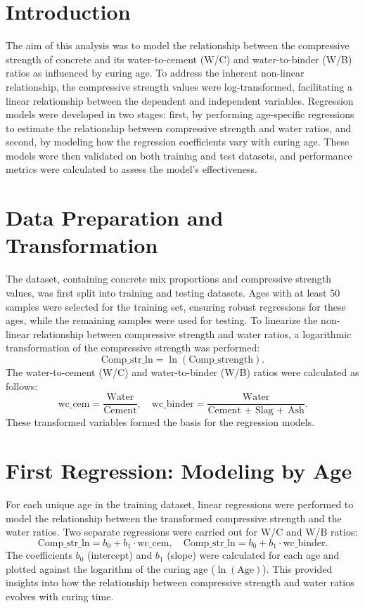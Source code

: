 \documentclass[a4paper,11pt]{article}
\begin{document}
\section*{Introduction}
The aim of this analysis was to model the relationship between the compressive strength of concrete and its water-to-cement (W/C) and water-to-binder (W/B) ratios as influenced by curing age. To address the inherent non-linear relationship, the compressive strength values were log-transformed, facilitating a linear relationship between the dependent and independent variables. Regression models were developed in two stages: first, by performing age-specific regressions to estimate the relationship between compressive strength and water ratios, and second, by modeling how the regression coefficients vary with curing age. These models were then validated on both training and test datasets, and performance metrics were calculated to assess the model’s effectiveness.

\section*{Data Preparation and Transformation}
The dataset, containing concrete mix proportions and compressive strength values, was first split into training and testing datasets. Ages with at least 50 samples were selected for the training set, ensuring robust regressions for these ages, while the remaining samples were used for testing. To linearize the non-linear relationship between compressive strength and water ratios, a logarithmic transformation of the compressive strength was performed:
\[
\text{Comp\_str\_ln} = \ln(\text{Comp\_strength}).
\]
The water-to-cement (W/C) and water-to-binder (W/B) ratios were calculated as follows:
\[
\text{wc\_cem} = \frac{\text{Water}}{\text{Cement}}, \quad \text{wc\_binder} = \frac{\text{Water}}{\text{Cement + Slag + Ash}}.
\]
These transformed variables formed the basis for the regression models.

\section*{First Regression: Modeling by Age}
For each unique age in the training dataset, linear regressions were performed to model the relationship between the transformed compressive strength and the water ratios. Two separate regressions were carried out for W/C and W/B ratios:
\[
\text{Comp\_str\_ln} = b_0 + b_1 \cdot \text{wc\_cem}, \quad \text{Comp\_str\_ln} = b_0 + b_1 \cdot \text{wc\_binder}.
\]
The coefficients \( b_0 \) (intercept) and \( b_1 \) (slope) were calculated for each age and plotted against the logarithm of the curing age (\( \ln(\text{Age}) \)). This provided insights into how the relationship between compressive strength and water ratios evolves with curing time.
\end{document}
